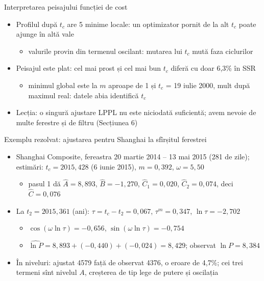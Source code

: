 \begin{frame}{Interpretarea peisajului funcției de cost}
\itemsize{\small}
\begin{itemize}
    \item Profilul după $t_c$ are 5 minime locale: un optimizator pornit de la alt $t_c$ poate ajunge în altă vale
    \begin{itemize}
        \item valurile provin din termenul oscilant: mutarea lui $t_c$ mută faza ciclurilor
    \end{itemize}
    \item Peisajul este plat: cel mai prost și cel mai bun $t_c$ diferă cu doar 6{,}3\% în SSR
    \begin{itemize}
        \item minimul global este la $m$ aproape de 1 și $t_c$ = 19 iulie 2000, mult după maximul real: datele abia identifică $t_c$
    \end{itemize}
    \item Lecția: o singură ajustare LPPL nu este niciodată suficientă; avem nevoie de multe ferestre și de filtru (Secțiunea 6)
\end{itemize}
\end{frame}

\begin{frame}{Exemplu rezolvat: ajustarea pentru Shanghai la sfîrșitul ferestrei}
\itemsize{\footnotesize}
\begin{itemize}
    \item Shanghai Composite, fereastra 20 martie 2014 -- 13 mai 2015 (281 de zile); estimări: $t_c = 2015{,}428$ (6 iunie 2015), $m = 0{,}392$, $\omega = 5{,}50$
    \begin{itemize}
        \item pasul 1 dă $\hat A = 8{,}893$, $\hat B = -1{,}270$, $\hat C_1 = 0{,}020$, $\hat C_2 = 0{,}074$, deci $\hat C = 0{,}076$
    \end{itemize}
    \item La $t_2 = 2015{,}361$ (ani): $\tau = t_c - t_2 = 0{,}067$, $\tau^m = 0{,}347$, $\ln\tau = -2{,}702$
    \begin{itemize}
        \item $\cos(\omega\ln\tau) = -0{,}656$, $\sin(\omega\ln\tau) = -0{,}754$
        \item $\widehat{\ln P} = 8{,}893 + (-0{,}440) + (-0{,}024) = 8{,}429$; observat $\ln P = 8{,}384$
    \end{itemize}
    \item În niveluri: ajustat 4579 față de observat 4376, o eroare de 4{,}7\%; cei trei termeni sînt nivelul $A$, creșterea de tip lege de putere și oscilația
\end{itemize}
\end{frame}

